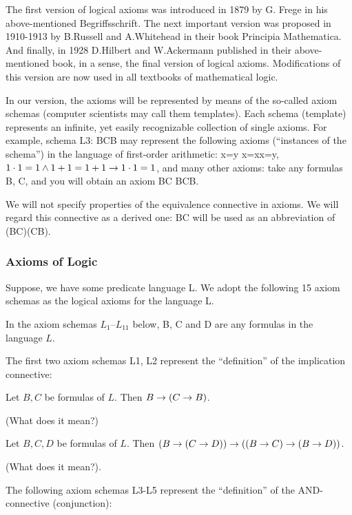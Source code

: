 The first version of logical axioms was introduced in 1879 by G. Frege in his above-mentioned
Begriffsschrift. The next important version was proposed in 1910-1913 by B.Russell and A.Whitehead in
their book Principia Mathematica. And finally, in 1928 D.Hilbert and W.Ackermann published in their
above-mentioned book, in a sense, the final version of logical axioms. Modifications of this version are
now used in all textbooks of mathematical logic.

In our version, the axioms will be represented by means of the so-called axiom schemas (computer
scientists may call them templates). Each schema (template) represents an infinite, yet easily recognizable
collection of single axioms. For example, schema L3: B\AND C\IMPLIES B may represent the following axioms
(``instances of the schema'') in the language of first-order arithmetic:
x=y \AND  x=x\IMPLIES x=y,
\(1\cdot 1=1 \wedge  1+1=1+1\rightarrow 1\cdot 1=1\),
and many other axioms: take any formulas B, C, and you will obtain an axiom B\AND C B\AND C\IMPLIES B.

We will not specify properties of the equivalence connective in axioms. We will regard this connective as a derived one: B\IFF C will be used as an abbreviation of (B\IMPLIES C)\AND (C\IMPLIES B).

\subsubsection*{Axioms of Logic}

Suppose, we have some predicate language L. We adopt the following 15 axiom schemas as the logical axioms for the language L.

In the axiom schemas \(L_1\)--\(L_{11}\) below, B, C and D are any formulas in the language \(L\).

The first two axiom schemas L1, L2 represent the ``definition'' of the implication connective:

\begin{axiom}
Let \(B,C\) be formulas of \(L\).
Then \(B\rightarrow (C\rightarrow B)\).
\end{axiom}
(What does it mean?)

\begin{axiom}
Let \(B,C,D\) be formulas of \(L\).
Then \((B\rightarrow (C\rightarrow D))\rightarrow ((B\rightarrow C)\rightarrow (B\rightarrow D))\).
\end{axiom}
(What does it mean?).

The following axiom schemas L3-L5 represent the ``definition'' of the AND-connective (conjunction):

